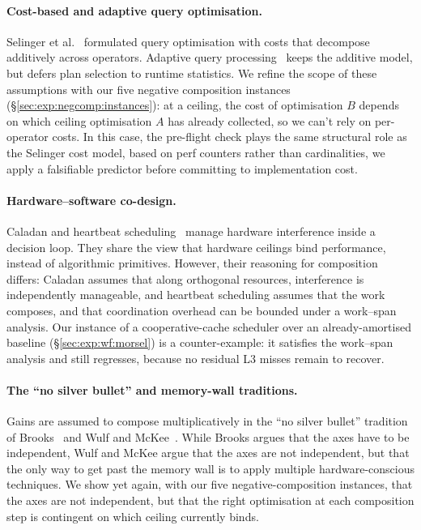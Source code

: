 \paragraph{Cost-based and adaptive query optimisation.} Selinger et al.~\cite{selinger_1979} formulated query optimisation with costs that decompose additively across operators. Adaptive query processing~\cite{avnur_hellerstein_2000} keeps the additive model, but defers plan selection to runtime statistics. We refine the scope of these assumptions with our five negative composition instances (§\ref{sec:exp:negcomp:instances}): at a ceiling, the cost of optimisation $B$ depends on which ceiling optimisation $A$ has already collected, so we can't rely on per-operator costs. In this case, the pre-flight check plays the same structural role as the Selinger cost model, based on perf counters rather than cardinalities, we apply a falsifiable predictor before committing to implementation cost.

\paragraph{Hardware--software co-design.}

Caladan and heartbeat scheduling~\cite{fried_2020_caladan,acar_2018_heartbeat} manage hardware interference inside a decision loop. They share the view that hardware ceilings bind performance, instead of algorithmic primitives. However, their reasoning for composition differs: Caladan assumes that along orthogonal resources, interference is independently manageable, and heartbeat scheduling assumes that the work composes, and that coordination overhead can be bounded under a work--span analysis. Our instance of a cooperative-cache scheduler over an already-amortised baseline (§\ref{sec:exp:wf:morsel}) is a counter-example: it satisfies the work--span analysis and still regresses, because no residual L3 misses remain to recover.

\paragraph{The ``no silver bullet'' and memory-wall traditions.}
Gains are assumed to compose multiplicatively in the ``no silver bullet'' tradition of Brooks~\cite{brooks_1987} and Wulf and McKee~\cite{wulf_mckee_1995}. While Brooks argues that the axes have to be independent, Wulf and McKee argue that the axes are not independent, but that the only way to get past the memory wall is to apply multiple hardware-conscious techniques. We show yet again, with our five negative-composition instances, that the axes are not independent, but that the right optimisation at each composition step is contingent on which ceiling currently binds.

